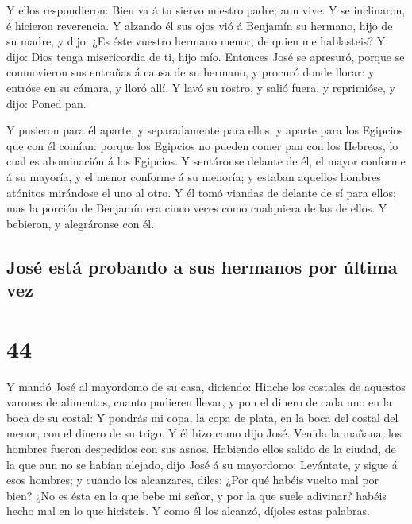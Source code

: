  Y ellos respondieron: Bien va á tu siervo nuestro padre;
aun vive. Y se inclinaron, é hicieron reverencia.  Y
alzando él sus ojos vió á Benjamín su hermano, hijo de su madre, y dijo:
¿Es éste vuestro hermano menor, de quien me hablasteis? Y dijo: Dios
tenga misericordia de ti, hijo mío.  Entonces José se
apresuró, porque se conmovieron sus entrañas á causa de su hermano, y
procuró donde llorar: y entróse en su cámara, y lloró allí.
 Y lavó su rostro, y salió fuera, y reprimióse, y dijo:
Poned pan.

 Y pusieron para él aparte, y separadamente para ellos, y
aparte para los Egipcios que con él comían: porque los Egipcios no
pueden comer pan con los Hebreos, lo cual es abominación á los Egipcios.
 Y sentáronse delante de él, el mayor conforme á su
mayoría, y el menor conforme á su menoría; y estaban aquellos hombres
atónitos mirándose el uno al otro.  Y él tomó viandas de
delante de sí para ellos; mas la porción de Benjamín era cinco veces
como cualquiera de las de ellos. Y bebieron, y alegráronse con él.

\hypertarget{josuxe9-estuxe1-probando-a-sus-hermanos-por-uxfaltima-vez}{%
\subsection{José está probando a sus hermanos por última
vez}\label{josuxe9-estuxe1-probando-a-sus-hermanos-por-uxfaltima-vez}}

\hypertarget{section-43}{%
\section{44}\label{section-43}}

 Y mandó José al mayordomo de su casa, diciendo: Hinche los
costales de aquestos varones de alimentos, cuanto pudieren llevar, y pon
el dinero de cada uno en la boca de su costal:  Y pondrás mi
copa, la copa de plata, en la boca del costal del menor, con el dinero
de su trigo. Y él hizo como dijo José.  Venida la mañana,
los hombres fueron despedidos con sus asnos.  Habiendo ellos
salido de la ciudad, de la que aun no se habían alejado, dijo José á su
mayordomo: Levántate, y sigue á esos hombres; y cuando los alcanzares,
diles: ¿Por qué habéis vuelto mal por bien?  ¿No es ésta en
la que bebe mi señor, y por la que suele adivinar? habéis hecho mal en
lo que hicisteis.  Y como él los alcanzó, díjoles estas
palabras.


